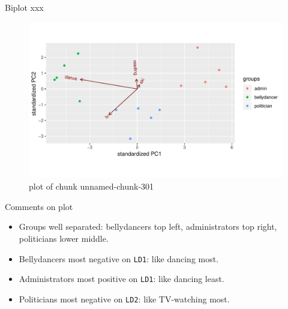 \documentclass[ignorenonframetext,]{beamer}
\newenvironment{Shaded}{\begin{snugshade}}{\end{snugshade}}
\newcommand{\DataTypeTok}[1]{\textcolor[rgb]{0.13,0.29,0.53}{#1}}
\newcommand{\FloatTok}[1]{\textcolor[rgb]{0.00,0.00,0.81}{#1}}
\newcommand{\KeywordTok}[1]{\textcolor[rgb]{0.13,0.29,0.53}{\textbf{#1}}}
\newcommand{\NormalTok}[1]{#1}
\newcommand{\OperatorTok}[1]{\textcolor[rgb]{0.81,0.36,0.00}{\textbf{#1}}}
\begin{document}
\begin{frame}[fragile]{Biplot xxx}
\protect\hypertarget{biplot-xxx}{}

\begin{Shaded}
\end{Shaded}

\begin{figure}
\centering
\includegraphics{figure/unnamed-chunk-301-1.pdf}
\caption{plot of chunk unnamed-chunk-301}
\end{figure}

\end{frame}

\begin{frame}[fragile]{Comments on plot}
\protect\hypertarget{comments-on-plot}{}

\begin{itemize}
\item
  Groups well separated: bellydancers top left, administrators top
  right, politicians lower middle.
\item
  Bellydancers most negative on \texttt{LD1}: like dancing most.
\item
  Administrators most positive on \texttt{LD1}: like dancing least.
\item
  Politicians most negative on \texttt{LD2}: like TV-watching most.
\end{itemize}

\end{frame}
\end{document}
